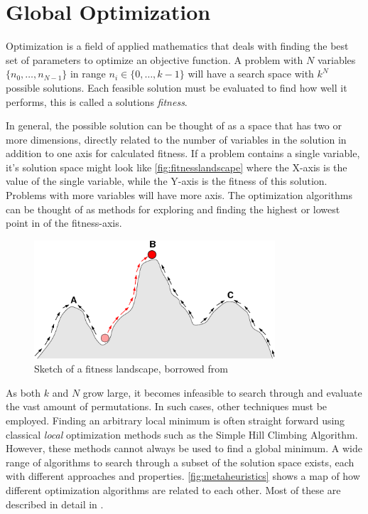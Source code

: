 \section{Global Optimization}

Optimization is a field of applied mathematics that deals with finding the best
set of parameters to optimize an objective function. A problem with $N$
variables $\{n_0, \dots, n_{N-1}\}$ in range $n_i \in \{0, \dots, k-1\}$ will
have a search space with $k^N$ possible solutions. Each feasible solution must
be evaluated to find how well it performs, this is called a solutions
\emph{fitness}.

In general, the possible solution can be thought of as a space that has two or
more dimensions, directly related to the number of variables in the solution
in addition to one axis for calculated fitness. If a problem contains a single
variable, it's solution space might look like \autoref{fig:fitnesslandscape}
where the X-axis is the value of the single variable, while the Y-axis is the
fitness of this solution. Problems with more variables will have more axis. The
optimization algorithms can be thought of as methods for exploring and finding
the highest or lowest point in of the fitness-axis.

\begin{figure}
    \centering
    \includegraphics[width=0.8\textwidth]{figs/Fitness-landscape-cartoon.png}
    \caption{Sketch of a fitness landscape, borrowed from \cite{wikifitnesslandscape}}
    \label{fig:fitnesslandscape}
\end{figure}

As both $k$ and $N$ grow large, it becomes infeasible to search
through and evaluate the vast amount of permutations. In such cases, other
techniques must be employed. Finding an arbitrary local minimum is often
straight forward using classical \emph{local} optimization methods such as the
Simple Hill Climbing Algorithm. However, these methods cannot always be used to
find a global minimum\cite{russellnorvig}. A wide range of algorithms to search
through a subset of the solution space exists, each with different approaches
and properties. \autoref{fig:metaheuristics} shows a map of how different
optimization algorithms are related to each other. Most of these are described
in detail in \cite{russellnorvig}.

